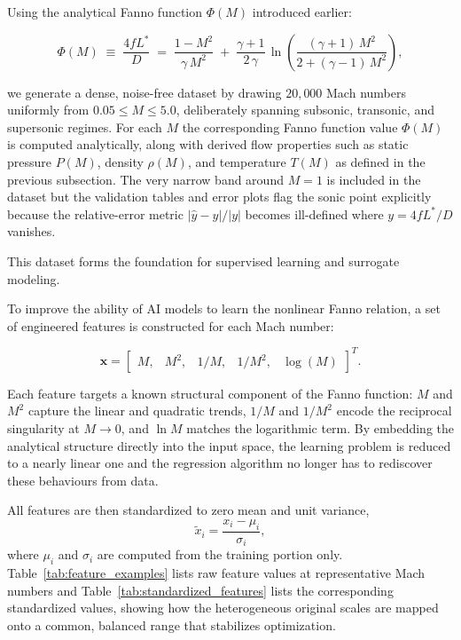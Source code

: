 \documentclass[11pt,a4paper]{report}
\begin{document}
Using the analytical Fanno function $\Phi(M)$ introduced earlier:

\begin{equation}
\label{eq:fanno_function}
\Phi(M) \;\equiv\; \frac{4 f L^{*}}{D} \;=\;
\frac{1 - M^{2}}{\gamma\, M^{2}} \;+\; \frac{\gamma + 1}{2\,\gamma}\,
\ln\!\left( \frac{(\gamma + 1)\,M^{2}}{2 + (\gamma - 1)\,M^{2}} \right),
\end{equation}

we generate a dense, noise-free dataset by drawing $20{,}000$ Mach numbers uniformly from $0.05 \le M \le 5.0$, deliberately spanning subsonic, transonic, and supersonic regimes. For each $M$ the corresponding Fanno function value $\Phi(M)$ is computed analytically, along with derived flow properties such as static pressure $P(M)$, density $\rho(M)$, and temperature $T(M)$ as defined in the previous subsection. The very narrow band around $M = 1$ is included in the dataset but the validation tables and error plots flag the sonic point explicitly because the relative-error metric $|\hat{y}-y|/|y|$ becomes ill-defined where $y = 4fL^{*}/D$ vanishes.  

This dataset forms the foundation for supervised learning and surrogate modeling.

To improve the ability of AI models to learn the nonlinear Fanno relation, a set of engineered features is constructed for each Mach number:

\begin{equation}
\mathbf{x} = 
\begin{bmatrix}
M, & M^2, & 1/M, & 1/M^2, & \log(M)
\end{bmatrix}^T.
\end{equation}

Each feature targets a known structural component of the Fanno function: $M$ and $M^{2}$ capture the linear and quadratic trends, $1/M$ and $1/M^{2}$ encode the reciprocal singularity at $M\to 0$, and $\ln M$ matches the logarithmic term. By embedding the analytical structure directly into the input space, the learning problem is reduced to a nearly linear one and the regression algorithm no longer has to rediscover these behaviours from data.

All features are then standardized to zero mean and unit variance,
\begin{equation}
\tilde{x}_i = \frac{x_i - \mu_i}{\sigma_i},
\end{equation}
where $\mu_i$ and $\sigma_i$ are computed from the training portion only. Table~\ref{tab:feature_examples} lists raw feature values at representative Mach numbers and Table~\ref{tab:standardized_features} lists the corresponding standardized values, showing how the heterogeneous original scales are mapped onto a common, balanced range that stabilizes optimization.
\end{document}
